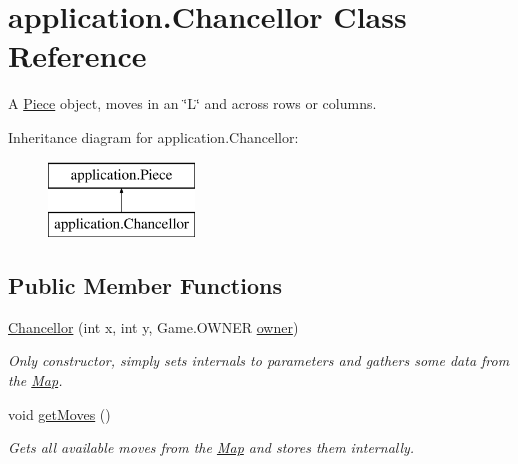 \hypertarget{classapplication_1_1_chancellor}{\section{application.\+Chancellor Class Reference}
\label{classapplication_1_1_chancellor}
}


A \hyperlink{classapplication_1_1_piece}{Piece} object, moves in an \char`\"{}\+L\char`\"{} and across rows or columns.  


Inheritance diagram for application.\+Chancellor\+:\begin{figure}[H]
\begin{center}
\leavevmode
\includegraphics[height=2.000000cm]{classapplication_1_1_chancellor}
\end{center}
\end{figure}
\subsection*{Public Member Functions}
\begin{DoxyCompactItemize}
\item 
\hyperlink{classapplication_1_1_chancellor_a22e2dd42ff9699ffc8d430d5d3abb3e3}{Chancellor} (int x, int y, Game.\+O\+W\+N\+E\+R \hyperlink{classapplication_1_1_piece_a724f116bd99a66a6f6bcc8b7b35de131}{owner})
\begin{DoxyCompactList}\small\item\em Only constructor, simply sets internals to parameters and gathers some data from the \hyperlink{classapplication_1_1_map}{Map}. \end{DoxyCompactList}\item 
\hypertarget{classapplication_1_1_chancellor_a5fab8909007808c56e8ab511d738a543}{void \hyperlink{classapplication_1_1_chancellor_a5fab8909007808c56e8ab511d738a543}{get\+Moves} ()}\label{classapplication_1_1_chancellor_a5fab8909007808c56e8ab511d738a543}

\begin{DoxyCompactList}\small\item\em Gets all available moves from the \hyperlink{classapplication_1_1_map}{Map} and stores them internally. \end{DoxyCompactList}\end{DoxyCompactItemize}
